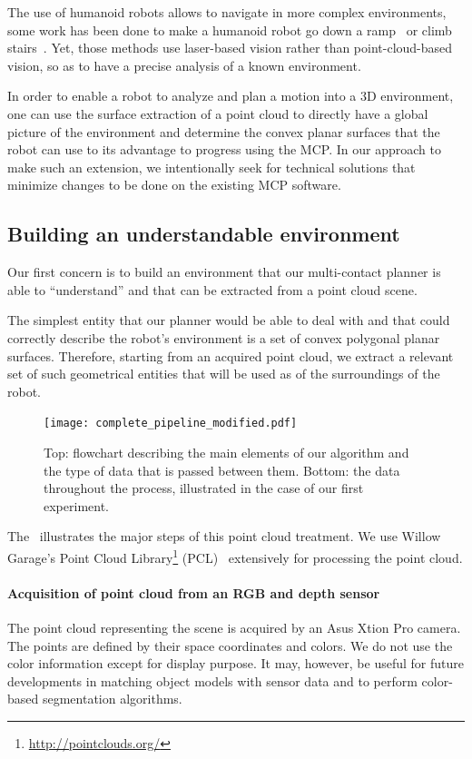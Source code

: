 The use of humanoid robots allows to navigate in more complex environments, some work has been done to make a humanoid robot go down a ramp~\cite{lutz:iros:2012} or climb stairs~\cite{osswald:iros:2012}.
Yet, those methods use laser-based vision rather than point-cloud-based vision, so as to have a precise analysis of a known environment.

In order to enable a robot to analyze and plan a motion into a 3D environment, one can use the surface extraction of a point cloud to directly have a global picture of the environment and determine the convex planar surfaces that the robot can use to its advantage to progress using the MCP.\@
In our approach to make such an extension, we intentionally seek for technical solutions that minimize changes to be done on the existing MCP software.

\subsection{Building an understandable environment}
\label{sub:building_an_understandable_environment}

Our first concern is to build an environment that our multi-contact planner is able to ``understand'' and that can be extracted from a point cloud scene.

The simplest entity that our planner would be able to deal with and that could correctly describe the robot's environment is a set of convex polygonal planar surfaces.
Therefore, starting from an acquired point cloud, we extract a relevant set of such geometrical entities that will be used as of the surroundings of the robot.

\begin{figure}
\centering
  \texttt{[image: complete\_pipeline\_modified.pdf]}
  \caption{Top: flowchart describing the main elements of our algorithm and the type of data that is passed between them. Bottom: the data throughout the process, illustrated in the case of our first experiment.}
\label{fig:full_pipeline}
\end{figure}

The~ illustrates the major steps of this point cloud treatment.
We use Willow Garage's Point Cloud Library\footnote{\url{http://pointclouds.org/}} (PCL)~\cite{rusu:icra:2011} extensively for processing the point cloud.

\paragraph{Acquisition of point cloud from an RGB and depth sensor}
The point cloud representing the scene is acquired by an Asus Xtion Pro camera.
The points are defined by their space coordinates and colors.
We do not use the color information except for display purpose.
It may, however, be useful for future developments in matching object models with sensor data and to perform color-based segmentation algorithms.

